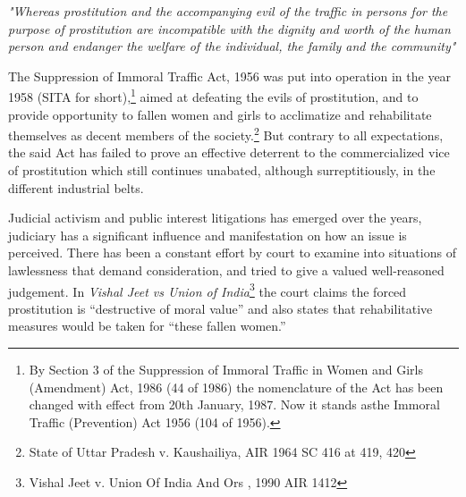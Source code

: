 \begin{multicols}{2}
\vspace{-.1cm}

\noi
\textit{"Whereas prostitution and the accompanying evil of the traffic in persons for the purpose of
prostitution are incompatible with the dignity and worth of the human person and endanger
the welfare of the individual, the family and the community"}

\vspace{-.1cm}

\noi
The Suppression of Immoral Traffic Act, 1956 was put into operation in the year 1958 (SITA
for short),\footnote{By Section 3 of the Suppression of Immoral Traffic in Women and Girls (Amendment) Act, 1986 (44 of 1986) the nomenclature of the Act has been changed with effect from 20th January, 1987. Now it stands asthe Immoral Traffic (Prevention) Act 1956 (104 of 1956).} aimed at defeating the evils of prostitution, and to provide opportunity to fallen
women and girls to acclimatize and rehabilitate themselves as decent members of the society.\footnote{State of Uttar Pradesh v. Kaushailiya, AIR 1964 SC 416 at 419, 420} But contrary to all expectations, the said Act has failed to prove an effective deterrent to the commercialized vice of prostitution which still continues unabated, although surreptitiously, in the different industrial belts.

\vspace{-.1cm}

\noi
Judicial activism and public interest litigations has emerged over the years, judiciary has a
significant influence and manifestation on how an issue is perceived. There has been a constant
effort by court to examine into situations of lawlessness that demand consideration, and tried to give a valued well-reasoned judgement. In \textit{Vishal Jeet vs Union of India}\footnote{Vishal Jeet v. Union Of India And Ors , 1990 AIR 1412} the court claims the forced prostitution is “destructive of moral value” and also states that rehabilitative measures would be taken for “these fallen women.”

\vspace{-.2cm}


\vspace{-.1cm}


\end{multicols}
